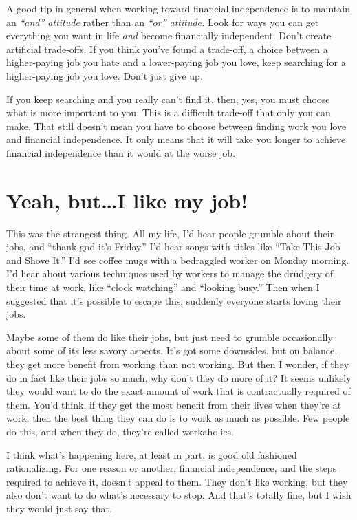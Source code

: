 A good tip in general when working toward financial independence is to maintain an \emph{``and'' attitude} rather than an \emph{``or'' attitude.} Look for ways you can get everything you want in life \emph{and} become financially independent. Don't create artificial trade-offs. If you think you've found a trade-off, a choice between a higher-paying job you hate and a lower-paying job you love, keep searching for a higher-paying job you love. Don't just give up.

If you keep searching and you really can't find it, then, yes, you must choose what is more important to you. This is a difficult trade-off that only you can make. That still doesn't mean you have to choose between finding work you love and financial independence. It only means that it will take you longer to achieve financial independence than it would at the worse job.

\section{Yeah, but\ldots I like my job!}
This was the strangest thing. All my life, I'd hear people grumble about their jobs, and ``thank god it's Friday.'' I'd hear songs with titles like ``Take This Job and Shove It.'' I'd see coffee mugs with a bedraggled worker on Monday morning. I'd hear about various techniques used by workers to manage the drudgery of their time at work, like ``clock watching'' and ``looking busy.'' Then when I suggested that it's possible to escape this, suddenly everyone starts loving their jobs.

Maybe some of them do like their jobs, but just need to grumble occasionally about some of its less savory aspects. It's got some downsides, but on balance, they get more benefit from working than not working. But then I wonder, if they do in fact like their jobs so much, why don't they do more of it? It seems unlikely they would want to do the exact amount of work that is contractually required of them. You'd think, if they get the most benefit from their lives when they're at work, then the best thing they can do is to work as much as possible. Few people do this, and when they do, they're called workaholics.

I think what's happening here, at least in part, is good old fashioned rationalizing. For one reason or another, financial independence, and the steps required to achieve it, doesn't appeal to them. They don't like working, but they also don't want to do what's necessary to stop. And that's totally fine, but I wish they would just say that.

